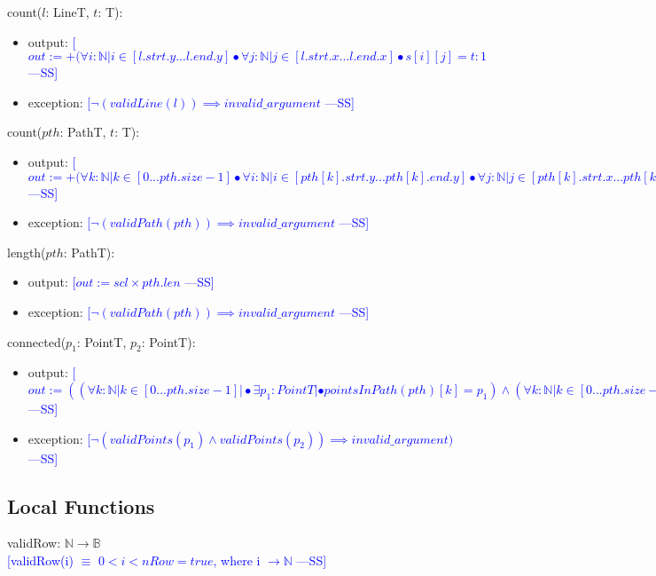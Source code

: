 \documentclass[12pt]{article}
\newcommand{\authornote}[3]{\textcolor{#1}{[#3 ---#2]}}
\newcommand{\authornote}[3]{}
\newcommand{\wss}[1]{\authornote{blue}{SS}{#1}}
\begin{document}
\noindent count($l$: LineT, $t$: T):
\begin{itemize}
\item output: \wss{$out:= +(\forall i : \mathbb{N} | i \in [l.strt.y...l.end.y] \bullet \forall j : \mathbb{N} | j \in [l.strt.x...l.end.x] \bullet s[i][j] = t : 1$}
\item exception: \wss{$\lnot(validLine(l)) \implies invalid\_argument$}
\end{itemize}

\noindent count($\mathit{pth}$: PathT, $t$: T):
\begin{itemize}
\item output: \wss{$out:= +(\forall k :\mathbb{N} | k \in [0...pth.size-1] \bullet \forall i : \mathbb{N} | i \in [pth[k].strt.y...pth[k].end.y] \bullet \forall j : \mathbb{N} | j \in [pth[k].strt.x...pth[k].end.x] \bullet s[i][j] = t : 1$}
\item exception: \wss{$\lnot(validPath(pth)) \implies invalid\_argument$}
\end{itemize}

\noindent length($\mathit{pth}$: PathT):
\begin{itemize}
\item output: \wss{$out := scl \times pth.len$}
\item exception: \wss{$\lnot(validPath(pth)) \implies invalid\_argument$}
\end{itemize}

\noindent connected($p_1$: PointT, $p_2$: PointT):
\begin{itemize}
\item output: \wss{$out := ((\forall k : \mathbb{N} | k \in [0...pth.size - 1] | \bullet \exists p_1 : PointT | \bullet pointsInPath(pth)[k] = p_1) \land (\forall k : \mathbb{N} | k \in [0...pth.size - 1] | \bullet \exists p_2 : PointT | \bullet pointsInPath(pth)[k] = p_2)) \implies true$}
\item exception: \wss{$\lnot(validPoints(p_1) \land validPoints(p_2)) \implies invalid\_argument)$}

\end{itemize}

\subsection*{Local Functions}

\noindent validRow: $\mathbb{N} \rightarrow \mathbb{B}$\\
\noindent \wss{validRow(i) $\equiv$ $0 < i < nRow = true$, where i $\rightarrow \mathbb{N}$}\\
\end{document}
